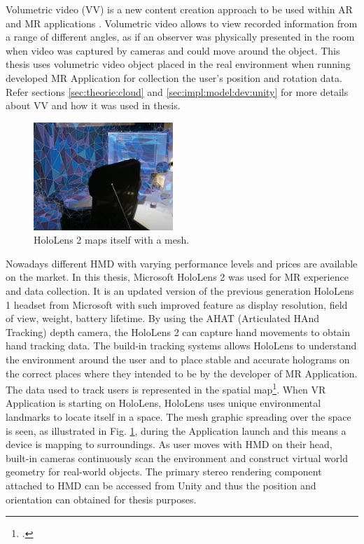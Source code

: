 Volumetric video (VV) is a new content creation approach to be used within AR and MR applications \cite{user_behav_volumetric}. Volumetric video allows to view recorded information from a range of different angles, as if an observer was physically presented in the room when video was captured by cameras and could move around the object. This thesis uses volumetric video object placed in the real environment when running developed MR Application for collection the user's position and rotation data. Refer sections \ref{sec:theorie:cloud} and \ref{sec:impl:model:dev:unity} for more details about VV and how it was used in thesis. 
\begin{figure}
	\centering
	\includegraphics[width=0.47\textwidth]{gfx/hololens_env.png}
	\caption{\label{fig:holo2_env}HoloLens 2 maps itself with a mesh.}
\end{figure}

Nowadays different HMD with varying performance levels and prices are available on the market. In this thesis, Microsoft HoloLens 2 was used for MR experience and data collection. It is an updated version of the previous generation HoloLens 1 headset from Microsoft with such improved feature as display resolution, field of view, weight, battery lifetime. By using the AHAT (Articulated HAnd Tracking) depth camera, the HoloLens 2 can capture hand movements to obtain hand tracking data. The build-in tracking systems allows HoloLens to understand the environment around the user and to place stable and accurate holograms on the correct places where they intended to be by the developer of MR Application. The data used to track users is represented in the spatial map\footcite{https://docs.microsoft.com/en-us/hololens/hololens-environment-considerations}. When VR Application is starting on HoloLens, HoloLens uses unique environmental landmarks to locate itself in a space. The mesh graphic spreading over the space is seen, as illustrated in Fig. \ref{fig:holo2_env}, during the Application launch and this means a device is mapping to surroundings. As user moves with HMD on their head, built-in cameras continuously scan the environment and construct virtual world geometry for real-world objects. The primary stereo rendering component attached to HMD can be accessed from Unity and thus the position and orientation can obtained for thesis purposes. 

